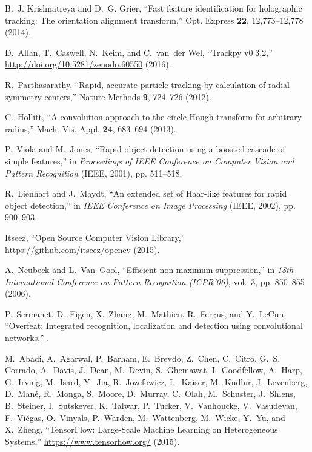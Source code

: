 \documentclass[10pt,letterpaper]{article}
\begin{document}
\begin{thebibliography}{10}
B.~J. Krishnatreya and D.~G. Grier, \enquote{Fast feature identification for
  holographic tracking: The orientation alignment transform,} Opt. Express
  \textbf{22}, 12,773--12,778 (2014).

D.~Allan, T.~Caswell, N.~Keim, and C.~van~der Wel, \enquote{Trackpy v0.3.2,}
  \url{http://doi.org/10.5281/zenodo.60550} (2016).

R.~Parthasarathy, \enquote{Rapid, accurate particle tracking by calculation of
  radial symmetry centers,} Nature Methods \textbf{9}, 724--726 (2012).

C.~Hollitt, \enquote{A convolution approach to the circle Hough transform for
  arbitrary radius,} Mach. Vis. Appl. \textbf{24}, 683--694
  (2013).

P.~Viola and M.~Jones, \enquote{Rapid object detection using a boosted cascade
  of simple features,} in \emph{Proceedings of IEEE Conference 
  on Computer Vision and Pattern Recognition} (IEEE, 2001), pp. 511--518.

R.~Lienhart and J.~Maydt, \enquote{An extended set of {Haar}-like features for
  rapid object detection,} in \emph{IEEE Conference on Image Processing}
  (IEEE, 2002), pp. 900--903.

Itseez, \enquote{Open Source Computer Vision Library,}
  \url{https://github.com/itseez/opencv} (2015).

A.~Neubeck and L.~Van~Gool, \enquote{Efficient non-maximum suppression,} in
  \emph{18th International Conference on Pattern Recognition (ICPR'06)},
  vol.~3, pp. 850--855 (2006).

P.~Sermanet, D.~Eigen, X.~Zhang, M.~Mathieu, R.~Fergus, and Y.~LeCun,
  \enquote{Overfeat: Integrated recognition, localization and detection using
  convolutional networks,} .

M.~Abadi, A.~Agarwal, P.~Barham, E.~Brevdo, Z.~Chen, C.~Citro, G.~S. Corrado,
  A.~Davis, J.~Dean, M.~Devin, S.~Ghemawat, I.~Goodfellow, A.~Harp, G.~Irving,
  M.~Isard, Y.~Jia, R.~Jozefowicz, L.~Kaiser, M.~Kudlur, J.~Levenberg,
  D.~Man\'{e}, R.~Monga, S.~Moore, D.~Murray, C.~Olah, M.~Schuster, J.~Shlens,
  B.~Steiner, I.~Sutskever, K.~Talwar, P.~Tucker, V.~Vanhoucke, V.~Vasudevan,
  F.~Vi\'{e}gas, O.~Vinyals, P.~Warden, M.~Wattenberg, M.~Wicke, Y.~Yu, and
  X.~Zheng, \enquote{{TensorFlow}: Large-Scale Machine Learning on
  Heterogeneous Systems,}  
  \url{https://www.tensorflow.org/} (2015).


\end{thebibliography}
\end{document}
